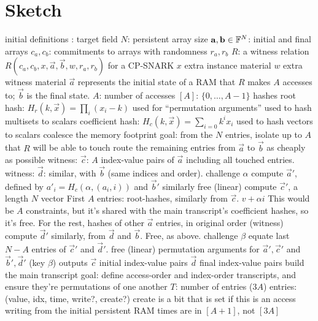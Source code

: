 \section{Sketch}
\begin{outline}
\1 initial definitions
  \2 \FF: target field
  \2 $N$: persistent array size
  \2 $\vec a, \vec b \in \FF^N$: initial and final arrays
  \2 $c_a, c_b$: commitments to arrays with randomness $r_a, r_b$
  \2 $R$: a witness relation $R(c_a, c_b, x, \vec a, \vec b, w, r_a, r_b)$ for a CP-SNARK
    \3 $x$ extra instance material
    \3 $w$ extra witness material
    \3 $\vec a$ represents the initial state of a RAM that $R$ makes $A$
    accesses to; $\vec b$ is the final state.
    \2 $A$: number of accesses 
  \2 $[A]$: $\{0, \dots, A-1\}$
  \2 hashes
    \3 root hash: $H_r(k, \vec x) = \prod_i (x_i - k)$
      \4 used for ``permutation arguments''
      \4 used to hash multisets to scalars
    \3 coefficient hash: $H_c(k, \vec x) = \sum_{i=0} k^ix_i$
      \4 used to hash vectors to scalars
\1 coalesce the memory footprint
  \2 goal: from the $N$ entries, isolate up to $A$ that $R$ will be able to
  touch
    \3 route the remaining entries from $\vec a$ to $\vec b$ as cheaply as
       possible
  \2 witness: $\vec c$: $A$ index-value pairs of $\vec a$ including all touched entries.
  \2 witness: $\vec d$: similar, with $\vec b$ (same indices and order).
  \2 challenge $\alpha$
  \2 compute $\vec a'$, defined by $a'_i = H_c(\alpha, (a_i, i))$ and $\vec b'$ similarly
    \3 free (linear)
  \2 compute $\vec c'$, a length $N$ vector
    \3 First $A$ entries: root-hashes, similarly from $\vec c$.
      \4 $v + \alpha i$
      \4 This would be $A$ constraints, but it's shared with the main
      transcript's coefficient hashes, so it's free.
    \3 For the rest, hashes of other $\vec a$ entries, in original order (witness)
  \2 compute $\vec d'$ similarly, from $\vec d$ and $\vec b$.
    \3 Free, as above.
  \2 challenge $\beta$
  \2 equate last $N-A$ entries of $\vec c'$ and $\vec d'$.
    \3 free (linear)
  \2 permutation arguments for $\vec a', \vec c'$ and $\vec b', \vec d'$ (key $\beta$)
    \3 
  \2 outputs
    \3 $\vec c$ initial index-value pairs
    \3 $\vec d$ final index-value pairs
\1 build the main transcript
  \2 goal: define access-order and index-order transcripts, and ensure they're
  permutations of one another
  \2 $T$: number of entries ($3A$)
  \2 entries: (value, idx, time, write?, create?)
    \2 create is a bit that is set if this is an access writing from the initial persistent RAM
    \2 times are in $[A+1]$, not $[3A]$

\end{outline}
